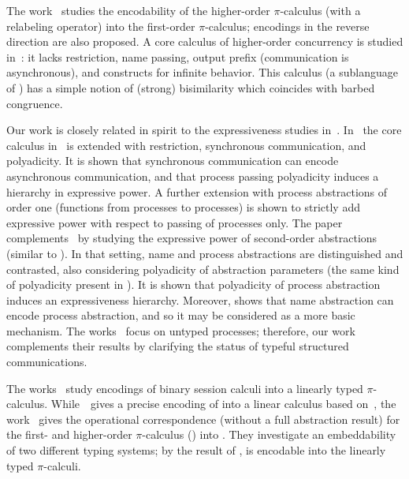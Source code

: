 The work~\cite{XuActa2012} studies the encodability of the higher-order $\pi$-calculus (with a relabeling operator) into the first-order $\pi$-calculus; encodings in the reverse direction are also proposed. %
A core calculus of higher-order concurrency is studied in~\cite{DBLP:journals/iandc/LanesePSS11}: it lacks restriction,  name passing, output prefix (communication is asynchronous), and constructs for infinite behavior. 
This calculus (a sublanguage of \HO) has 
a simple notion of (strong) bisimilarity which coincides with barbed congruence.

Our work is closely related in spirit to the expressiveness studies in~\cite{DBLP:conf/icalp/LanesePSS10,DBLP:conf/wsfm/XuYL13}.
In~\cite{DBLP:conf/icalp/LanesePSS10}
the core calculus in~\cite{DBLP:journals/iandc/LanesePSS11} is extended with restriction,
synchronous communication, and polyadicity. It is shown that 
synchronous communication can encode asynchronous communication, %
and that process passing polyadicity induces a hierarchy in expressive power. %
A further extension with process abstractions of order one
(functions from processes to processes)
 is shown to strictly add expressive power with respect to passing of processes only.
The paper~\cite{DBLP:conf/wsfm/XuYL13} complements~\cite{DBLP:conf/icalp/LanesePSS10} by studying the expressive power of second-order abstractions (similar to \HO). 
In that setting, name and process abstractions are distinguished and contrasted, also considering polyadicity of abstraction parameters (the same kind of polyadicity present in \pHOp). It is shown that polyadicity of process abstraction induces an expressiveness hierarchy. Moreover, \cite{DBLP:conf/wsfm/XuYL13} shows that name abstraction can encode process abstraction, and so it may be considered as a more basic mechanism. 
The works~\cite{DBLP:conf/icalp/LanesePSS10,DBLP:conf/wsfm/XuYL13} focus on untyped processes;
therefore, our work complements their  results
 by clarifying the status of typeful %
 structured communications. %

The works~\cite{DemangeonH11,Dardha:2012:STR:2370776.2370794} 
study encodings of binary session calculi into a linearly typed $\pi$-calculus. 
While~\cite{DemangeonH11}~gives a precise encoding of \sessp into a linear calculus 
based on~\cite{BHY},  
the work~\cite{Dardha:2012:STR:2370776.2370794} 
gives the operational correspondence 
(without a full abstraction result)
for the first- and higher-order 
$\pi$-calculus (\cite{tlca07}) into \cite{LinearPi}. 
They investigate an embeddability of two different typing systems;
by the result of \cite{DemangeonH11}, 
\HOpp is encodable  into the linearly typed $\pi$-calculi.     

